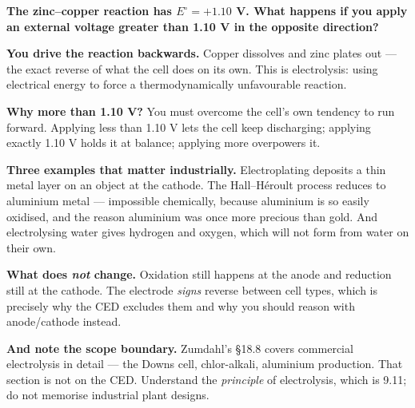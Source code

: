 \documentclass{apchem-worksheet}
\begin{document}
\begin{workedexample}
\textbf{The zinc--copper reaction has $E^{\circ} = +1.10$ V. What
happens if you apply an external voltage greater than 1.10 V in the
opposite direction?}

\textbf{You drive the reaction backwards.} Copper dissolves and zinc
plates out --- the exact reverse of what the cell does on its own. This
is electrolysis: using electrical energy to force a thermodynamically
unfavourable reaction.

\textbf{Why more than 1.10 V?} You must overcome the cell's own
tendency to run forward. Applying less than 1.10 V lets the cell keep
discharging; applying exactly 1.10 V holds it at balance; applying more
overpowers it.

\textbf{Three examples that matter industrially.} Electroplating
deposits a thin metal layer on an object at the cathode. The
Hall--H\'{e}roult process reduces  to aluminium metal ---
impossible chemically, because aluminium is so easily oxidised, and the
reason aluminium was once more precious than gold. And electrolysing
water gives hydrogen and oxygen, which will not form from water on their
own.

\textbf{What does \emph{not} change.} Oxidation still happens at the
anode and reduction still at the cathode. The electrode \emph{signs}
reverse between cell types, which is precisely why the CED excludes them
and why you should reason with anode/cathode instead.

\textbf{And note the scope boundary.} Zumdahl's \S18.8 covers commercial
electrolysis in detail --- the Downs cell, chlor-alkali, aluminium
production. That section is not on the CED. Understand the
\emph{principle} of electrolysis, which is 9.11; do not memorise
industrial plant designs.
\end{workedexample}
\end{document}
